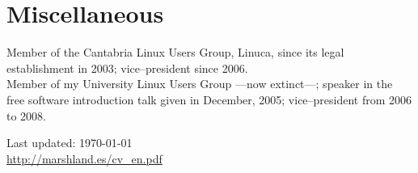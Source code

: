 \documentclass[11pt, a4paper]{article}
\begin{document}
\section*{Miscellaneous} %
\noindent
Member of the Cantabria Linux Users Group, Linuca, since its legal establishment in 2003; vice--president since 2006.\\
Member of my University Linux Users Group ---now extinct---; speaker in the free software introduction talk given in December, 2005; vice--president from 2006 to 2008.


\vfill{}
\hrulefill


\begin{center}
{\scriptsize
	Last updated: \today \\
	\href{http://marshland.es/cv_en.pdf}
	     {http://marshland.es/cv\_en.pdf}
}
\end{center}
\end{document}
